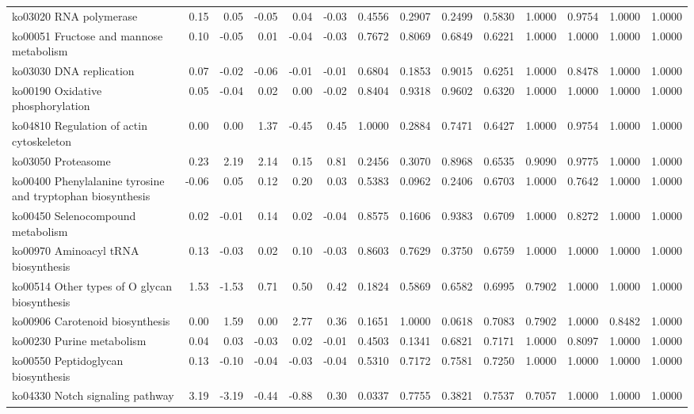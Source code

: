 {\begin{landscape}
\begin{longtable}{ | l | r | r | r | r | r | r  | r | r | r | r | r | r  | r  |}
			ko03020  RNA polymerase & 0.15 & 0.05 & -0.05 & 0.04 & -0.03 & 0.4556 & 0.2907 & 0.2499 & 0.5830 & 1.0000 & 0.9754 & 1.0000 & 1.0000 \\ 
			ko00051  Fructose and mannose metabolism & 0.10 & -0.05 & 0.01 & -0.04 & -0.03 & 0.7672 & 0.8069 & 0.6849 & 0.6221 & 1.0000 & 1.0000 & 1.0000 & 1.0000 \\ 
			ko03030  DNA replication & 0.07 & -0.02 & -0.06 & -0.01 & -0.01 & 0.6804 & 0.1853 & 0.9015 & 0.6251 & 1.0000 & 0.8478 & 1.0000 & 1.0000 \\ 
			ko00190  Oxidative phosphorylation & 0.05 & -0.04 & 0.02 & 0.00 & -0.02 & 0.8404 & 0.9318 & 0.9602 & 0.6320 & 1.0000 & 1.0000 & 1.0000 & 1.0000 \\ 
			ko04810  Regulation of actin cytoskeleton & 0.00 & 0.00 & 1.37 & -0.45 & 0.45 & 1.0000 & 0.2884 & 0.7471 & 0.6427 & 1.0000 & 0.9754 & 1.0000 & 1.0000 \\ 
			ko03050  Proteasome & 0.23 & 2.19 & 2.14 & 0.15 & 0.81 & 0.2456 & 0.3070 & 0.8968 & 0.6535 & 0.9090 & 0.9775 & 1.0000 & 1.0000 \\ 
			ko00400  Phenylalanine tyrosine and tryptophan biosynthesis & -0.06 & 0.05 & 0.12 & 0.20 & 0.03 & 0.5383 & 0.0962 & 0.2406 & 0.6703 & 1.0000 & 0.7642 & 1.0000 & 1.0000 \\ 
			ko00450  Selenocompound metabolism & 0.02 & -0.01 & 0.14 & 0.02 & -0.04 & 0.8575 & 0.1606 & 0.9383 & 0.6709 & 1.0000 & 0.8272 & 1.0000 & 1.0000 \\ 
			ko00970  Aminoacyl tRNA biosynthesis & 0.13 & -0.03 & 0.02 & 0.10 & -0.03 & 0.8603 & 0.7629 & 0.3750 & 0.6759 & 1.0000 & 1.0000 & 1.0000 & 1.0000 \\ 
			ko00514  Other types of O glycan biosynthesis & 1.53 & -1.53 & 0.71 & 0.50 & 0.42 & 0.1824 & 0.5869 & 0.6582 & 0.6995 & 0.7902 & 1.0000 & 1.0000 & 1.0000 \\ 
			ko00906  Carotenoid biosynthesis & 0.00 & 1.59 & 0.00 & 2.77 & 0.36 & 0.1651 & 1.0000 & 0.0618 & 0.7083 & 0.7902 & 1.0000 & 0.8482 & 1.0000 \\ 
			ko00230  Purine metabolism & 0.04 & 0.03 & -0.03 & 0.02 & -0.01 & 0.4503 & 0.1341 & 0.6821 & 0.7171 & 1.0000 & 0.8097 & 1.0000 & 1.0000 \\ 
			ko00550  Peptidoglycan biosynthesis & 0.13 & -0.10 & -0.04 & -0.03 & -0.04 & 0.5310 & 0.7172 & 0.7581 & 0.7250 & 1.0000 & 1.0000 & 1.0000 & 1.0000 \\ 
			ko04330  Notch signaling pathway & 3.19 & -3.19 & -0.44 & -0.88 & 0.30 & 0.0337 & 0.7755 & 0.3821 & 0.7537 & 0.7057 & 1.0000 & 1.0000 & 1.0000 \\ 

\end{longtable}
\end{landscape}}
